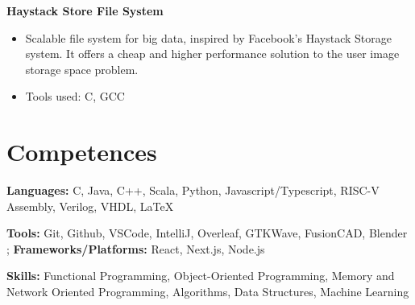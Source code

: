 \documentclass[a4paper, 10pt]{article}
\newenvironment{highlights}{
    \begin{itemize}[
        topsep=0.10 cm,
        parsep=0.10 cm,
        partopsep=0pt,
        itemsep=0pt,
        leftmargin=0.4 cm + 10pt
    ]
}{
    \end{itemize}
} %
\let\hrefWithoutArrow\href
\renewcommand{\href}[2]{\hrefWithoutArrow{#1}{\ifthenelse{\equal{#2}{}}{ }{#2 }\raisebox{.15ex}{\footnotesize \faExternalLink*}}}
\begin{document}
        \textbf{Haystack Store File System}\href{https://github.com/relogamimano/haystack-store}{}
        \begin{highlights}
            \item Scalable file system for big data, inspired by Facebook's Haystack Storage system. It offers a cheap and higher performance solution to the user image storage space problem.
            \item Tools used: C, GCC
        \end{highlights}





        
        
    
    \section{Competences}
    \textbf{Languages:} C, Java, C++, Scala, Python, Javascript/Typescript, RISC-V Assembly, Verilog, VHDL, LaTeX
    
    \vspace{0.2 cm}
    
    \textbf{Tools:} Git, Github, VSCode, IntelliJ, Overleaf, GTKWave, FusionCAD, Blender ; \textbf{Frameworks/Platforms:} React, Next.js, Node.js
    
    \vspace{0.2cm}
    
    \textbf{Skills:} Functional Programming, Object-Oriented Programming, Memory and Network Oriented Programming, Algorithms, Data Structures, Machine Learning
    
\end{document}
